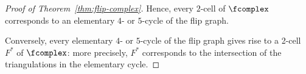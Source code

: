 \begin{proof}[Proof of Theorem~\ref{thm:flip-complex}]
%
%

Hence, every $2$-cell of $\fcomplex$ corresponds to an elementary $4$- or $5$-cycle of the flip graph.

Conversely, every elementary $4$- or $5$-cycle of the flip graph gives rise to a 2-cell $F^*$ of $\fcomplex$: more precisely, $F^*$ corresponds to the intersection of the triangulations in the elementary cycle.  
\end{proof}











